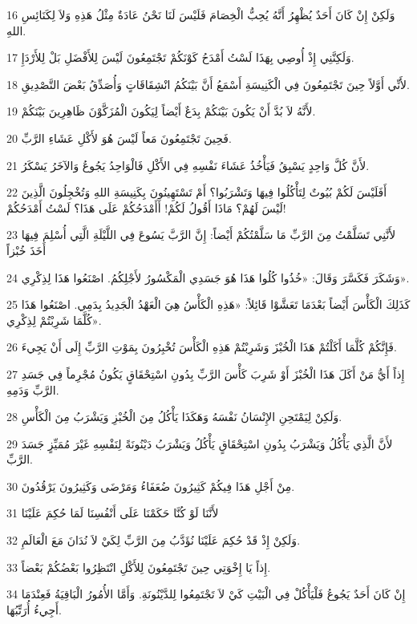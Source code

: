 \par 16 وَلَكِنْ إِنْ كَانَ أَحَدٌ يُظْهِرُ أَنَّهُ يُحِبُّ الْخِصَامَ فَلَيْسَ لَنَا نَحْنُ عَادَةٌ مِثْلُ هَذِهِ وَلاَ لِكَنَائِسِ اللهِ.
\par 17 وَلَكِنَّنِي إِذْ أُوصِي بِهَذَا لَسْتُ أَمْدَحُ كَوْنَكُمْ تَجْتَمِعُونَ لَيْسَ لِلأَفْضَلِ بَلْ لِلأَرْدَإِ.
\par 18 لأَنِّي أَوَّلاً حِينَ تَجْتَمِعُونَ فِي الْكَنِيسَةِ أَسْمَعُ أَنَّ بَيْنَكُمُ انْشِقَاقَاتٍ وَأُصَدِّقُ بَعْضَ التَّصْدِيقِ.
\par 19 لأَنَّهُ لاَ بُدَّ أَنْ يَكُونَ بَيْنَكُمْ بِدَعٌ أَيْضاً لِيَكُونَ الْمُزَكَّوْنَ ظَاهِرِينَ بَيْنَكُمْ.
\par 20 فَحِينَ تَجْتَمِعُونَ مَعاً لَيْسَ هُوَ لأَكْلِ عَشَاءِ الرَّبِّ.
\par 21 لأَنَّ كُلَّ وَاحِدٍ يَسْبِقُ فَيَأْخُذُ عَشَاءَ نَفْسِهِ فِي الأَكْلِ فَالْوَاحِدُ يَجُوعُ وَالآخَرُ يَسْكَرُ.
\par 22 أَفَلَيْسَ لَكُمْ بُيُوتٌ لِتَأْكُلُوا فِيهَا وَتَشْرَبُوا؟ أَمْ تَسْتَهِينُونَ بِكَنِيسَةِ اللهِ وَتُخْجِلُونَ الَّذِينَ لَيْسَ لَهُمْ؟ مَاذَا أَقُولُ لَكُمْ! أَأَمْدَحُكُمْ عَلَى هَذَا؟ لَسْتُ أَمْدَحُكُمْ!
\par 23 لأَنَّنِي تَسَلَّمْتُ مِنَ الرَّبِّ مَا سَلَّمْتُكُمْ أَيْضاً: إِنَّ الرَّبَّ يَسُوعَ فِي اللَّيْلَةِ الَّتِي أُسْلِمَ فِيهَا أَخَذَ خُبْزاً
\par 24 وَشَكَرَ فَكَسَّرَ وَقَالَ: «خُذُوا كُلُوا هَذَا هُوَ جَسَدِي الْمَكْسُورُ لأَجْلِكُمُ. اصْنَعُوا هَذَا لِذِكْرِي».
\par 25 كَذَلِكَ الْكَأْسَ أَيْضاً بَعْدَمَا تَعَشَّوْا قَائِلاً: «هَذِهِ الْكَأْسُ هِيَ الْعَهْدُ الْجَدِيدُ بِدَمِي. اصْنَعُوا هَذَا كُلَّمَا شَرِبْتُمْ لِذِكْرِي».
\par 26 فَإِنَّكُمْ كُلَّمَا أَكَلْتُمْ هَذَا الْخُبْزَ وَشَرِبْتُمْ هَذِهِ الْكَأْسَ تُخْبِرُونَ بِمَوْتِ الرَّبِّ إِلَى أَنْ يَجِيءَ.
\par 27 إِذاً أَيُّ مَنْ أَكَلَ هَذَا الْخُبْزَ أَوْ شَرِبَ كَأْسَ الرَّبِّ بِدُونِ اسْتِحْقَاقٍ يَكُونُ مُجْرِماً فِي جَسَدِ الرَّبِّ وَدَمِهِ.
\par 28 وَلَكِنْ لِيَمْتَحِنِ الإِنْسَانُ نَفْسَهُ وَهَكَذَا يَأْكُلُ مِنَ الْخُبْزِ وَيَشْرَبُ مِنَ الْكَأْسِ.
\par 29 لأَنَّ الَّذِي يَأْكُلُ وَيَشْرَبُ بِدُونِ اسْتِحْقَاقٍ يَأْكُلُ وَيَشْرَبُ دَيْنُونَةً لِنَفْسِهِ غَيْرَ مُمَيِّزٍ جَسَدَ الرَّبِّ.
\par 30 مِنْ أَجْلِ هَذَا فِيكُمْ كَثِيرُونَ ضُعَفَاءُ وَمَرْضَى وَكَثِيرُونَ يَرْقُدُونَ.
\par 31 لأَنَّنَا لَوْ كُنَّا حَكَمْنَا عَلَى أَنْفُسِنَا لَمَا حُكِمَ عَلَيْنَا
\par 32 وَلَكِنْ إِذْ قَدْ حُكِمَ عَلَيْنَا نُؤَدَّبُ مِنَ الرَّبِّ لِكَيْ لاَ نُدَانَ مَعَ الْعَالَمِ.
\par 33 إِذاً يَا إِخْوَتِي حِينَ تَجْتَمِعُونَ لِلأَكْلِ انْتَظِرُوا بَعْضُكُمْ بَعْضاً.
\par 34 إِنْ كَانَ أَحَدٌ يَجُوعُ فَلْيَأْكُلْ فِي الْبَيْتِ كَيْ لاَ تَجْتَمِعُوا لِلدَّيْنُونَةِ. وَأَمَّا الأُمُورُ الْبَاقِيَةُ فَعِنْدَمَا أَجِيءُ أُرَتِّبُهَا.

